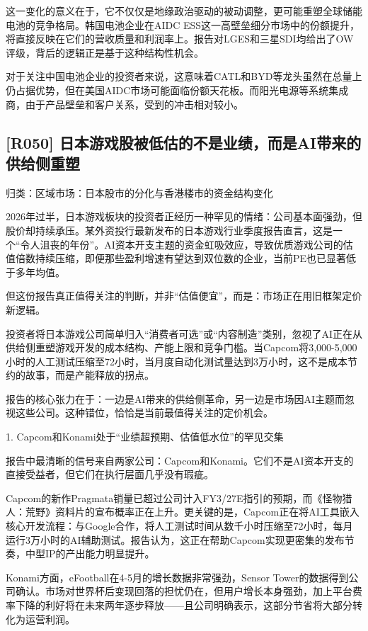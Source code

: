\documentclass[11pt]{ctexart}
\begin{document}
这一变化的意义在于，它不仅仅是地缘政治驱动的被动调整，更可能重塑全球储能电池的竞争格局。韩国电池企业在AIDC ESS这一高壁垒细分市场中的份额提升，将直接反映在它们的营收质量和利润率上。报告对LGES和三星SDI均给出了OW评级，背后的逻辑正是基于这种结构性机会。

对于关注中国电池企业的投资者来说，这意味着CATL和BYD等龙头虽然在总量上仍占据优势，但在美国AIDC市场可能面临份额天花板。而阳光电源等系统集成商，由于产品壁垒和客户关系，受到的冲击相对较小。

\subsection{[R050] 日本游戏股被低估的不是业绩，而是AI带来的供给侧重塑}
{\small\color{refgray}归类：区域市场：日本股市的分化与香港楼市的资金结构变化}

2026年过半，日本游戏板块的投资者正经历一种罕见的情绪：公司基本面强劲，但股价却持续承压。某外资投行最新发布的日本游戏行业季度报告直言，这是一个“令人沮丧的年份”。AI资本开支主题的资金虹吸效应，导致优质游戏公司的估值倍数持续压缩，即便那些盈利增速有望达到双位数的企业，当前PE也已显著低于多年均值。

但这份报告真正值得关注的判断，并非“估值便宜”，而是：市场正在用旧框架定价新逻辑。

投资者将日本游戏公司简单归入“消费者可选”或“内容制造”类别，忽视了AI正在从供给侧重塑游戏开发的成本结构、产能上限和竞争门槛。当Capcom将3,000-5,000小时的人工测试压缩至72小时，当月度自动化测试量达到3万小时，这不是成本节约的故事，而是产能释放的拐点。

报告的核心张力在于：一边是AI带来的供给侧革命，另一边是市场因AI主题而忽视这些公司。这种错位，恰恰是当前最值得关注的定价机会。

1. Capcom和Konami处于“业绩超预期、估值低水位”的罕见交集

报告中最清晰的信号来自两家公司：Capcom和Konami。它们不是AI资本开支的直接受益者，但它们在执行层面几乎没有瑕疵。

Capcom的新作Pragmata销量已超过公司计入FY3/27E指引的预期，而《怪物猎人：荒野》资料片的宣布概率正在上升。更关键的是，Capcom正在将AI工具嵌入核心开发流程：与Google合作，将人工测试时间从数千小时压缩至72小时，每月运行3万小时的AI辅助测试。报告认为，这正在帮助Capcom实现更密集的发布节奏，中型IP的产出能力明显提升。

Konami方面，eFootball在4-5月的增长数据非常强劲，Sensor Tower的数据得到公司确认。市场对世界杯后变现回落的担忧仍在，但用户增长本身强劲，加上平台费率下降的利好将在未来两年逐步释放——且公司明确表示，这部分节省将大部分转化为运营利润。
\end{document}
